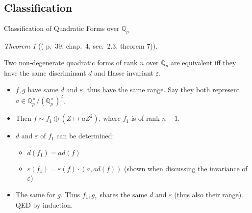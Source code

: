 \documentclass[fontset=fandol,envcountsect]{ctexbeamer}
\providecommand{\tightlist}{%
  \setlength{\itemsep}{0pt}\setlength{\parskip}{0pt}}\usepackage{longtable,booktabs,array}
\theoremstyle{theorem}
\newtheorem{theorem}{定理}
\theoremstyle{example}
\theoremstyle{remark}
\theoremstyle{theorem}
\newtheorem{theorem}{Theorem}
\theoremstyle{example}
\theoremstyle{remark}
\begin{document}
\subsection{Classification}\label{classification}

\begin{frame}{Classification of Quadratic Forms over \(\mathbb Q_p\)}
\label{classification-of-quadratic-forms-over-mathbb-q_p}
\begin{theorem}[(\autocite{serre_course_1973} p.~39, chap.~4, sec.~2.3,
theorem
7)]\protect\hypertarget{thm-qp-classification}{}\label{thm-qp-classification}

Two non-degenerate quadratic forms of rank \(n\) over \(\mathbb Q_p\)
are equivalent iff they have the same discriminant \(d\) and Hasse
invariant \(\varepsilon\).

\end{theorem}

\begin{itemize}
\item
  \(f,g\) have same \(d\) and \(\varepsilon\), thus have the same range.
  Say they both represent
  \(a \in \mathbb Q_p^\times / (\mathbb Q_p^\times)^2\).
\item
  Then \(f \sim f_1 \oplus (Z \mapsto a Z^2)\), where \(f_1\) is of rank
  \(n-1\).
\item
  \(d\) and \(\varepsilon\) of \(f_1\) can be determined:

  \begin{itemize}
  \tightlist
  \item
    \(d(f_1) = a d(f)\)
  \item
    \(\varepsilon(f_1) = \varepsilon(f) \cdot (a, a d(f))\) (shown when
    discussing the invariance of \(\varepsilon\))
  \end{itemize}
\item
  The same for \(g\). Thus \(f_1, g_1\) shares the same \(d\) and
  \(\varepsilon\) (thus also their range). QED by induction.
\end{itemize}
\end{frame}
\end{document}
